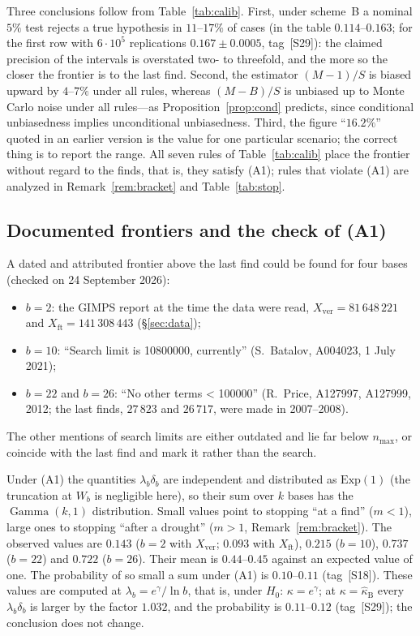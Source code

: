 \documentclass[11pt,a4paper]{article}
\theoremstyle{plain}
\theoremstyle{remark}
\newcommand{\eg}{e^{\gamma}}
\DeclareMathOperator{\Gam}{Gamma}
\begin{document}
Three conclusions follow from Table~\ref{tab:calib}. First, under scheme~B a
nominal $5\%$ test rejects a true hypothesis in $11$--$17\%$ of cases (in the
table $0.114$--$0.163$; for the first row with $6\cdot10^5$ replications
$0.167\pm0.0005$, tag~[S29]): the
claimed precision of the intervals is overstated two- to threefold, and the more
so the closer the frontier is to the last find. Second, the estimator $(M-1)/S$
is biased upward by $4$--$7\%$ under all rules, whereas $(M-B)/S$ is unbiased
up to Monte Carlo noise under all rules---as Proposition~\ref{prop:cond}
predicts, since conditional unbiasedness implies unconditional unbiasedness.
Third, the figure ``$16.2\%$'' quoted in an earlier version is the value for one
particular scenario; the correct thing is to report the range. All seven rules
of Table~\ref{tab:calib} place the frontier without regard to the finds, that
is, they satisfy (A1); rules that violate (A1) are analyzed in
Remark~\ref{rem:bracket} and Table~\ref{tab:stop}.

\subsection{Documented frontiers and the check of (A1)}\label{sec:frontiers}

A dated and attributed frontier above the last find could be found for four
bases (checked on 24 September 2026):
\begin{itemize}
\item $b=2$: the GIMPS report at the time the data were read,
$X_{\mathrm{ver}}=81\,648\,221$ and $X_{\mathrm{ft}}=141\,308\,443$
(\S\ref{sec:data});
\item $b=10$: ``Search limit is 10800000, currently'' (S.~Batalov, A004023,
1 July 2021);
\item $b=22$ and $b=26$: ``No other terms < 100000'' (R.~Price, A127997,
A127999, 2012; the last finds, $27\,823$ and $26\,717$, were made in
2007--2008).
\end{itemize}
The other mentions of search limits are either outdated and lie far below
$n_{\max}$, or coincide with the last find and mark it rather than the search.

Under (A1) the quantities $\lambda_b\delta_b$ are independent and distributed as
$\mathrm{Exp}(1)$ (the truncation at $W_b$ is negligible here), so their sum over
$k$ bases has the $\Gam(k,1)$ distribution. Small values point to stopping ``at a
find'' ($m<1$), large ones to stopping ``after a drought'' ($m>1$,
Remark~\ref{rem:bracket}). The observed values are $0.143$ ($b=2$ with
$X_{\mathrm{ver}}$; $0.093$ with $X_{\mathrm{ft}}$), $0.215$ ($b=10$), $0.737$
($b=22$) and $0.722$ ($b=26$). Their mean is $0.44$--$0.45$ against an expected
value of one. The probability of so small a sum under (A1) is $0.10$--$0.11$
(tag~[S18]). These values are computed at $\lambda_b=\eg/\ln b$, that is, under
$H_0$: $\kappa=\eg$; at $\kappa=\hat\kappa_{\mathrm B}$ every $\lambda_b\delta_b$ is
larger by the factor $1.032$, and the probability is $0.11$--$0.12$ (tag~[S29]);
the conclusion does not change.
\end{document}
